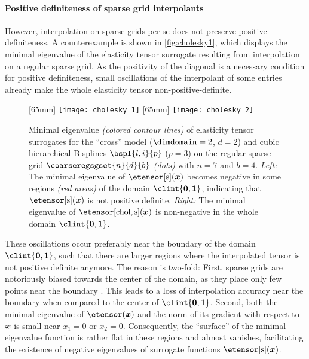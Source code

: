 \paragraph{Positive definiteness of sparse grid interpolants}

However, interpolation on sparse grids per se does not preserve
positive definiteness.
A counterexample is shown in \cref{fig:cholesky1},
which displays the minimal eigenvalue of the elasticity tensor surrogate
resulting from interpolation on a regular sparse grid.
As the positivity of the diagonal is a necessary condition
for positive definiteness,
small oscillations of the interpolant of some entries
already make the whole elasticity tensor non-positive-definite.

\begin{figure}
  [65mm]{%
    \texttt{[image: cholesky\_1]}%
  }%
  \hfill%
  [65mm]{%
    \texttt{[image: cholesky\_2]}%
  }%
  \hfill\hfill%
  \caption[%
    Minimal eigenvalue of interpolated elasticity tensors%
  ]{%
    Minimal eigenvalue \emph{(colored contour lines)}
    of elasticity tensor surrogates
    for the ``cross'' model ($\dimdomain = 2$, $d = 2$)
    and cubic hierarchical B-splines $\bspl{l,i}{p}$ ($p = 3$) on
    the regular sparse grid $\coarseregsgset{n}{d}{b}$ \emph{(dots)}
    with $n = 7$ and $b = 4$.
    \emph{Left:} The minimal eigenvalue of $\etensor[\sparse](\*x)$
    becomes negative in some regions \emph{\textcolor{C1}{(red areas)}}
    of the domain $\clint{\*0, \*1}$,
    indicating that $\etensor[\sparse](\*x)$ is not positive definite.
    \emph{Right:} The minimal eigenvalue of $\etensor[\chol,\sparse](\*x)$
    is non-negative in the whole domain $\clint{\*0, \*1}$.%
  }%
  \label{fig:cholesky}%
\end{figure}

These oscillations occur preferably near the boundary of the domain
$\clint{\*0, \*1}$, such that there are larger regions
where the interpolated tensor is not positive definite anymore.
The reason is two-fold:
First, sparse grids are notoriously biased towards the center of the domain,
as they place only few points near the boundary \cite{Pflueger10Spatially}.
This leads to a loss of interpolation accuracy near the boundary
when compared to the center of $\clint{\*0, \*1}$.
Second, both the minimal eigenvalue of $\etensor(\*x)$ and the norm of its
gradient with respect to ${\boldsymbol{x}}$ is small near $x_1 = 0$ or $x_2 = 0$.
Consequently, the ``surface'' of the minimal eigenvalue function
is rather flat in these regions and almost vanishes,
facilitating the existence of negative eigenvalues of
surrogate functions $\etensor[\sparse](\*x)$.

